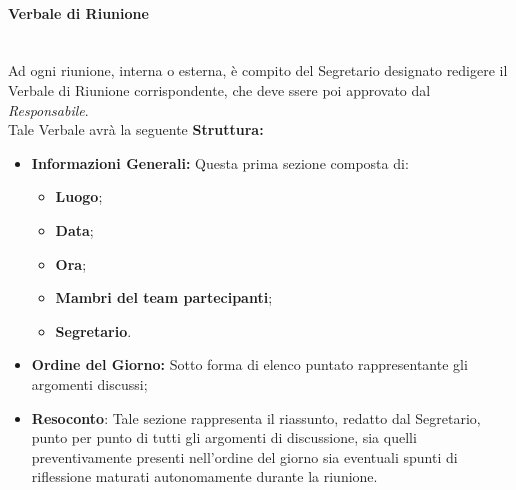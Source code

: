 \paragraph{Verbale di Riunione} ~\\
	Ad ogni riunione, interna o esterna, è compito del Segretario designato redigere il Verbale di Riunione 							corrispondente, che deve ssere poi approvato dal \textit{Responsabile}.\\
	Tale Verbale avrà la seguente \textbf{Struttura:}
	\begin{itemize}
	\item \textbf{Informazioni Generali:} Questa prima sezione composta di:
		\begin{itemize}
		\item \textbf{Luogo};
		\item \textbf{Data};
		\item \textbf{Ora};
		\item \textbf{Mambri del team partecipanti};
		\item \textbf{Segretario}.
		\end{itemize}
	\item \textbf{Ordine del Giorno:} Sotto forma di elenco puntato rappresentante gli argomenti discussi;
	\item \textbf{Resoconto}: Tale sezione rappresenta il riassunto, redatto dal Segretario, punto per punto di tutti 		gli argomenti di discussione, sia quelli preventivamente presenti nell'ordine del giorno sia eventuali spunti 				di riflessione maturati autonomamente durante la riunione.
	\end{itemize}
